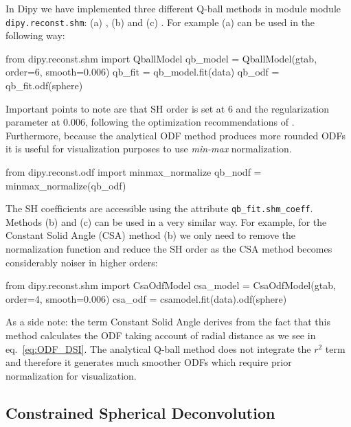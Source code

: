 \documentclass{bioinfo}
\begin{document}
In Dipy we have implemented three different Q-ball methods in module
module \texttt{dipy.reconst.shm}: (a)
\citet{descoteaux-angelino-etal:07}, (b) \citet{aganj-lenglet-etal:10}
and (c) \citet{tristan-vega-westin-etal:09}. For
example (a) can be used in the following way:
\begin{python}
from dipy.reconst.shm import QballModel
qb_model = QballModel(gtab, order=6, smooth=0.006)
qb_fit = qb_model.fit(data)
qb_odf = qb_fit.odf(sphere)
\end{python}
Important points to note are that SH order is set at $6$ and the regularization
parameter at $0.006$, following the optimization recommendations of
\citet{descoteaux-angelino-etal:06c}. Furthermore, because the
analytical ODF method produces more
rounded ODFs it is useful for visualization purposes to use \emph{min-max}
normalization.
\begin{python}
from dipy.reconst.odf import minmax_normalize
qb_nodf = minmax_normalize(qb_odf)
\end{python}
The SH coefficients are accessible using the attribute
\texttt{qb\_fit.shm\_coeff}. Methods (b) and (c) can be used in a very similar
way. For example, for the Constant Solid Angle (CSA)
\citep{aganj-lenglet-etal:10} method (b) we only need to remove the
normalization function and reduce the SH order as the CSA method becomes
considerably noiser in higher orders:
\begin{python}
from dipy.reconst.shm import CsaOdfModel
csa_model = CsaOdfModel(gtab, order=4,
                        smooth=0.006)
csa_odf = csamodel.fit(data).odf(sphere)
\end{python}
As a side note: the term Constant Solid Angle derives from the fact that this
method calculates the ODF taking account of radial distance as we see in
eq.~\ref{eq:ODF_DSI}. The analytical Q-ball method does not integrate the $r^2$
term and therefore it generates much smoother ODFs which require prior normalization 
for visualization.

\subsection{Constrained Spherical Deconvolution}
\end{document}
